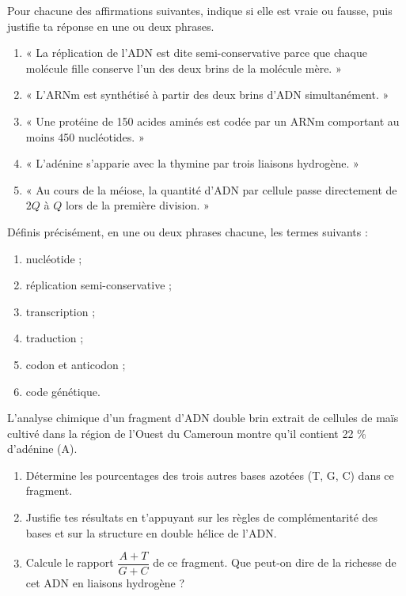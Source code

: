 \documentclass[11pt]{article}
\begin{document}
\begin{exercice}
Pour chacune des affirmations suivantes, indique si elle est vraie ou fausse, puis justifie ta réponse en une ou deux phrases.
\begin{enumerate}
\item « La réplication de l'ADN est dite semi-conservative parce que chaque molécule fille conserve l'un des deux brins de la molécule mère. »
\item « L'ARNm est synthétisé à partir des deux brins d'ADN simultanément. »
\item « Une protéine de 150 acides aminés est codée par un ARNm comportant au moins 450 nucléotides. »
\item « L'adénine s'apparie avec la thymine par trois liaisons hydrogène. »
\item « Au cours de la méiose, la quantité d'ADN par cellule passe directement de $2Q$ à $Q$ lors de la première division. »
\end{enumerate}
\end{exercice}

\begin{exercice}
Définis précisément, en une ou deux phrases chacune, les termes suivants :
\begin{enumerate}
\item nucléotide ;
\item réplication semi-conservative ;
\item transcription ;
\item traduction ;
\item codon et anticodon ;
\item code génétique.
\end{enumerate}
\end{exercice}

\begin{exercice}
L'analyse chimique d'un fragment d'ADN double brin extrait de cellules de maïs cultivé dans la région de l'Ouest du Cameroun montre qu'il contient 22 \% d'adénine (A).
\begin{enumerate}
\item Détermine les pourcentages des trois autres bases azotées (T, G, C) dans ce fragment.
\item Justifie tes résultats en t'appuyant sur les règles de complémentarité des bases et sur la structure en double hélice de l'ADN.
\item Calcule le rapport $\dfrac{A + T}{G + C}$ de ce fragment. Que peut-on dire de la richesse de cet ADN en liaisons hydrogène ?
\end{enumerate}
\end{exercice}
\end{document}
